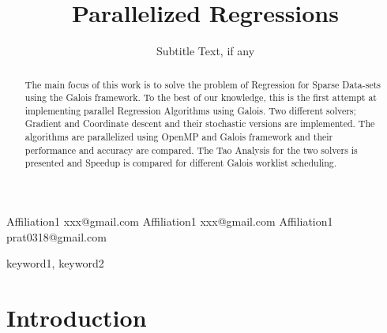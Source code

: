\documentclass{sigplanconf}
\begin{document}
\setlength{\pdfpageheight}{\paperheight}
\setlength{\pdfpagewidth}{\paperwidth}






\title{Parallelized Regressions}
\subtitle{Subtitle Text, if any}

           {Affiliation1}
           {xxx@gmail.com}
           {Affiliation1}
           {xxx@gmail.com}
           {Affiliation1}
           {prat0318@gmail.com}

\maketitle

\begin{abstract}
The main focus of this work is to solve the problem of Regression for Sparse Data-sets using the Galois framework.
To the best of our knowledge, this is the first attempt at implementing parallel Regression Algorithms using
Galois. Two different solvers; Gradient and Coordinate descent and their stochastic versions are implemented. The
algorithms are parallelized using OpenMP and Galois framework and their performance and accuracy are compared.
The Tao Analysis for the two solvers is presented and Speedup is compared for different Galois worklist scheduling. 
\end{abstract}


\keywords
keyword1, keyword2

\section{Introduction}
\end{document}
